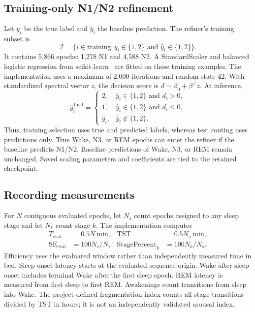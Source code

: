 \documentclass[pdflatex,sn-mathphys-num]{sn-jnl}
\begin{document}
\subsection{Training-only N1/N2 refinement}
Let $y_i$ be the true label and $\widehat{y}_i$ the baseline prediction. The refiner's training subset is
\begin{equation}
 \mathcal{I}=\{i\in\mathrm{training}:y_i\in\{1,2\}
 \text{ and }\widehat{y}_i\in\{1,2\}\}.
\end{equation}
It contains 5,866 epochs: 1,278 N1 and 4,588 N2. A StandardScaler and balanced logistic regression from scikit-learn~\cite{pedregosa2011} are fitted on these training examples. The implementation uses a maximum of 2,000 iterations and random state 42. With standardized spectral vector $z$, the decision score is $d=\beta_0+\beta^\top z$. At inference,
\begin{equation}
 \widehat{y}^{\,\mathrm{final}}_i=
 \begin{cases}
  2,&\widehat{y}_i\in\{1,2\}\text{ and }d_i>0,\\
  1,&\widehat{y}_i\in\{1,2\}\text{ and }d_i\leq0,\\
  \widehat{y}_i,&\widehat{y}_i\notin\{1,2\}.
 \end{cases}
\end{equation}
Thus, training selection uses true and predicted labels, whereas test routing uses predictions only. True Wake, N3, or REM epochs can enter the refiner if the baseline predicts N1/N2. Baseline predictions of Wake, N3, or REM remain unchanged. Saved scaling parameters and coefficients are tied to the retained checkpoint.

\subsection{Recording measurements}
For $N$ contiguous evaluated epochs, let $N_s$ count epochs assigned to any sleep stage and let $N_k$ count stage $k$. The implementation computes
\begin{align}
 T_{\mathrm{eval}}&=0.5N\ \mathrm{min}, &
 \mathrm{TST}&=0.5N_s\ \mathrm{min},\\
 \mathrm{SE}_{\mathrm{eval}}&=100N_s/N, &
 \mathrm{StagePercent}_k&=100N_k/N_s.
\end{align}
Efficiency uses the evaluated window rather than independently measured time in bed. Sleep onset latency starts at the evaluated sequence origin. Wake after sleep onset includes terminal Wake after the first sleep epoch. REM latency is measured from first sleep to first REM. Awakenings count transitions from sleep into Wake. The project-defined fragmentation index counts all stage transitions divided by TST in hours; it is not an independently validated arousal index.
\end{document}
